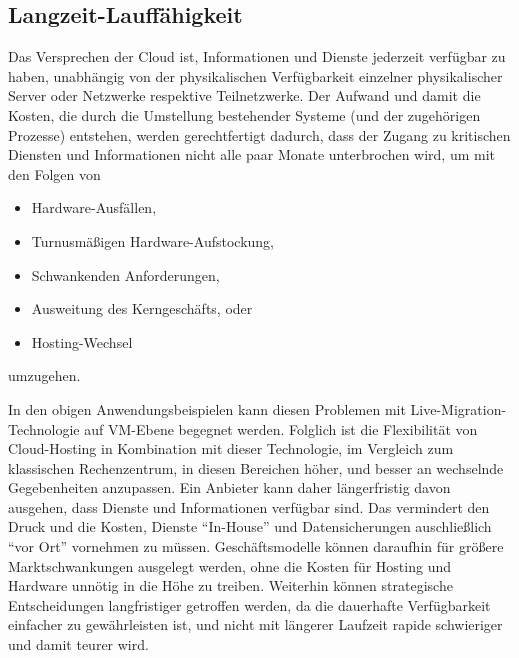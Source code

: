 \subsection{Langzeit-Lauffähigkeit}
\label{sec:langz-lauff}
Das Versprechen der Cloud ist, Informationen und Dienste jederzeit
verfügbar zu haben, unabhängig von der physikalischen Verfügbarkeit
einzelner physikalischer Server oder Netzwerke respektive
Teilnetzwerke. Der Aufwand und damit die Kosten, die durch die
Umstellung bestehender Systeme (und der zugehörigen Prozesse)
entstehen, werden gerechtfertigt dadurch, dass der Zugang zu
kritischen Diensten und Informationen nicht alle paar Monate
unterbrochen wird, um mit den Folgen von
\begin{itemize}
\item Hardware-Ausfällen,
\item Turnusmäßigen Hardware-Aufstockung,
\item Schwankenden Anforderungen,
\item Ausweitung des Kerngeschäfts, oder
\item Hosting-Wechsel
\end{itemize}
umzugehen.

In den obigen Anwendungsbeispielen kann diesen Problemen mit
Live-Migration-Technologie auf \ac{VM}-Ebene begegnet werden. Folglich
ist die Flexibilität von Cloud-Hosting in Kombination mit dieser
Technologie, im Vergleich zum klassischen Rechenzentrum, in diesen
Bereichen höher, und besser an wechselnde Gegebenheiten anzupassen.
Ein Anbieter kann daher längerfristig davon ausgehen, dass Dienste und
Informationen verfügbar sind. Das vermindert den Druck und die Kosten,
Dienste "`In-House"' und Datensicherungen auschließlich "`vor Ort"'
vornehmen zu müssen. Geschäftsmodelle können daraufhin für größere
Marktschwankungen ausgelegt werden, ohne die Kosten für Hosting und
Hardware unnötig in die Höhe zu treiben. Weiterhin können strategische
Entscheidungen langfristiger getroffen werden, da die dauerhafte
Verfügbarkeit einfacher zu gewährleisten ist, und nicht mit längerer
Laufzeit rapide schwieriger und damit teurer wird.


